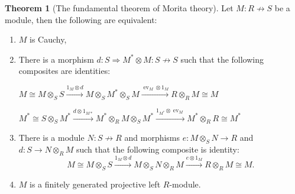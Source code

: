 \documentclass[8pt]{article}
\theoremstyle{definition}
\theoremstyle{definition}
\newtheorem{theorem}{Theorem}[section]
\theoremstyle{definition}
\theoremstyle{definition}
\theoremstyle{definition}
\theoremstyle{definition}
\theoremstyle{definition}
\theoremstyle{definition}
\theoremstyle{definition}
\theoremstyle{definition}
\theoremstyle{definition}
\theoremstyle{definition}
\theoremstyle{definition}
\theoremstyle{definition}
\theoremstyle{question}
\begin{document}
\begin{theorem}[The fundamental theorem of Morita theory]
  Let $M : R \not\to S$ be a module, then the following are equivalent:
  \begin{enumerate}
    \item $M$ is Cauchy,
    \item There is a morphism $d : S \Rightarrow M^* \otimes M : S \not\to S$ such that the following composites
    are identities:
    \begin{center}
    $M \cong M \otimes_S S \xrightarrow{1_M \otimes d} M \otimes_S M^* \otimes_S M \xrightarrow{\operatorname{ev}_M \otimes 1_M} R \otimes_R M \cong M$

    $M^* \cong S \otimes_S M^* \xrightarrow{d \otimes 1_{M*}} M^* \otimes_R M \otimes_S M^* \xrightarrow{1_{M^*} \otimes \operatorname{ev}_M} M^* \otimes_R R \cong M^*$
    \end{center}
    \item There is a module $N : S \not\to R$ and morphisms $e : M \otimes_S N \to R$ and $d : S \to N \otimes_R M$
    such that the following composite is identity:
    \[
    M \cong M \otimes_S S \xrightarrow{1_M \otimes d} M \otimes_S N \otimes_R M \xrightarrow{e \otimes 1_M} R \otimes_R M \cong M.
    \]
    \item $M$ is a finitely generated projective left $R$-module.
  \end{enumerate}
\end{theorem}
\end{document}

